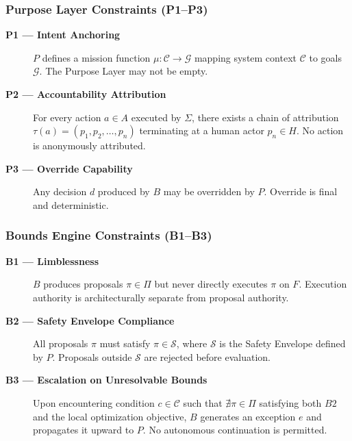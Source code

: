 \documentclass[12pt]{article}
\begin{document}
\subsubsection{Purpose Layer Constraints (P1--P3)}
\begin{description}
\item[\textbf{P1 — Intent Anchoring}] $P$ defines a mission function $\mu: \mathcal{C} \rightarrow \mathcal{G}$ mapping system context $\mathcal{C}$ to goals $\mathcal{G}$. The Purpose Layer may not be empty.
\item[\textbf{P2 — Accountability Attribution}] For every action $a \in A$ executed by $\Sigma$, there exists a chain of attribution $\tau(a) = (p_1, p_2, \ldots, p_n)$ terminating at a human actor $p_n \in H$. No action is anonymously attributed.
\item[\textbf{P3 — Override Capability}] Any decision $d$ produced by $B$ may be overridden by $P$. Override is final and deterministic.
\end{description}

\subsubsection{Bounds Engine Constraints (B1--B3)}
\begin{description}
\item[\textbf{B1 — Limblessness}] $B$ produces proposals $\pi \in \Pi$ but never directly executes $\pi$ on $F$. Execution authority is architecturally separate from proposal authority.
\item[\textbf{B2 — Safety Envelope Compliance}] All proposals $\pi$ must satisfy $\pi \in \mathcal{S}$, where $\mathcal{S}$ is the Safety Envelope defined by $P$. Proposals outside $\mathcal{S}$ are rejected before evaluation.
\item[\textbf{B3 — Escalation on Unresolvable Bounds}] Upon encountering condition $c \in \mathcal{C}$ such that $\nexists \pi \in \Pi$ satisfying both $B2$ and the local optimization objective, $B$ generates an exception $e$ and propagates it upward to $P$. No autonomous continuation is permitted.
\end{description}
\end{document}
